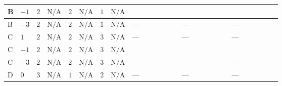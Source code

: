 \documentclass[8pt]{article}
\begin{document}
\begin{landscape}
\begin{longtable}{@{}llcccccc >{\raggedright\arraybackslash}p{0.21\linewidth} >{\raggedright\arraybackslash}p{0.21\linewidth} >{\raggedright\arraybackslash}p{0.21\linewidth}@{}}
B & $-1$ & $2$ & $\text{N/A}$ & $2$ & $\text{N/A}$ & $1$ & $\text{N/A}$ & \scriptsize\adjustbox{max width=\linewidth}{$\begin{gathered} {\lambda_{H H^\dagger S_1^\dagger S_2^\dagger}^{\rm Cross}} (6 \operatorname{Tr}\!\left({Y_d}\,\left({Y_d}\right)^{\dagger}\right)+2 \operatorname{Tr}\!\left({Y_e}\,\left({Y_e}\right)^{\dagger}\right)+6 \operatorname{Tr}\!\left({Y_u}\,\left({Y_u}\right)^{\dagger}\right))\end{gathered}$} & \scriptsize\adjustbox{max width=\linewidth}{$\begin{gathered} +{\lambda_{9}} (8 \left({\lambda_{H H^\dagger S_1^\dagger S_2^\dagger}^{\rm Cross}}\right)^{*}-4 \left({\lambda_{X_{17}}^{(1)}}\right)^{*})\end{gathered}$} & \scriptsize\adjustbox{max width=\linewidth}{$\begin{gathered} -9 {g_2}^2 {\lambda_{H H^\dagger S_1^\dagger S_2^\dagger}^{\rm Cross}}\end{gathered}$} \\
\midrule
B & $-3$ & $2$ & $\text{N/A}$ & $2$ & $\text{N/A}$ & $1$ & $\text{N/A}$ & --- & --- & --- \\
\midrule
C & $1$ & $2$ & $\text{N/A}$ & $2$ & $\text{N/A}$ & $3$ & $\text{N/A}$ & --- & --- & --- \\
\midrule
C & $-1$ & $2$ & $\text{N/A}$ & $2$ & $\text{N/A}$ & $3$ & $\text{N/A}$ & \scriptsize\adjustbox{max width=\linewidth}{$\begin{gathered} {\lambda_{H H^\dagger S_1^\dagger S_2^\dagger}^{\rm Cross}} (6 \operatorname{Tr}\!\left({Y_d}\,\left({Y_d}\right)^{\dagger}\right)+2 \operatorname{Tr}\!\left({Y_e}\,\left({Y_e}\right)^{\dagger}\right)+6 \operatorname{Tr}\!\left({Y_u}\,\left({Y_u}\right)^{\dagger}\right))\end{gathered}$} & \scriptsize\adjustbox{max width=\linewidth}{$\begin{gathered} +{\lambda_{9}} (8 \left({\lambda_{H H^\dagger S_1^\dagger S_2^\dagger}^{\rm Cross}}\right)^{*}-4 \left({\lambda_{X_{17}}^{(1)}}\right)^{*})\end{gathered}$} & \scriptsize\adjustbox{max width=\linewidth}{$\begin{gathered} -9 {g_2}^2 {\lambda_{H H^\dagger S_1^\dagger S_2^\dagger}^{\rm Cross}}\end{gathered}$} \\
\midrule
C & $-3$ & $2$ & $\text{N/A}$ & $2$ & $\text{N/A}$ & $3$ & $\text{N/A}$ & --- & --- & --- \\
\midrule
D & $0$ & $3$ & $\text{N/A}$ & $1$ & $\text{N/A}$ & $2$ & $\text{N/A}$ & --- & --- & --- \\

\end{longtable}
\end{landscape}
\end{document}
